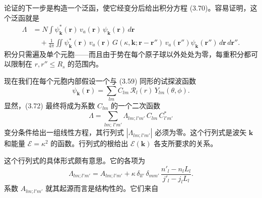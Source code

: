 
论证的下一步是构造一个泛函，使它经变分后给出积分方程 (3.70)。容易证明，这个泛函就是
\begin{align*}
\Lambda&=N\int\psi_{\mathbf{k}}^{*}(\mathbf{r})\,v_a(\mathbf{r})\,\psi_{\mathbf{k}}(\mathbf{r})\,d\mathbf{r}\\
&\quad+\frac{1}{4\pi}\iint\psi_{\mathbf{k}}^{*}(\mathbf{r})\,v_a(\mathbf{r})\,G(\kappa,\mathbf{k};\mathbf{r}-\mathbf{r}'')\,v_a(\mathbf{r}'')\psi_{\mathbf{k}}(\mathbf{r}'')\,d\mathbf{r}\,d\mathbf{r}''.\tag{3.72}
\end{align*}
积分只需遍及单个元胞——而且由于势在每个原子球以外处处为零，每重积分都可以限制在 $r,r''\leqslant R_s$ 的范围内。

现在我们在每个元胞内部假设一个与 (3.59) 同形的试探波函数
\begin{equation*}
\psi_{\mathbf{k}}(\mathbf{r})=\sum_{lm}C_{lm}\,\mathcal{R}_l(r)\,Y_{lm}(\theta,\phi).\tag{3.73}
\end{equation*}
显然，(3.72) 最终将成为系数 $C_{lm}$ 的一个二次函数
\begin{equation*}
\Lambda=\sum_{lm;\,l'm'}\Lambda_{lm;l'm'}\,C_{lm}\,C_{l'm'}^{*}\tag{3.74}
\end{equation*}
变分条件给出一组线性方程，其行列式 $|\Lambda_{lm;l'm'}|$ 必须为零。这个行列式是波矢 $\mathbf{k}$ 和能量 $\mathcal{E}=\kappa^2$ 的函数。行列式的根给出 $\mathcal{E}(\mathbf{k})$ 各支所要求的关系。

这个行列式的具体形式颇有意思。它的各项为
\begin{equation*}
\Lambda_{lm;l'm'}=A_{lm;l'm'}+\kappa\,\delta_{ll'}\,\delta_{mm'}\,\frac{n'_l-n_l L_l}{j'_l-j_l L_l}.\tag{3.75}
\end{equation*}
系数 $A_{lm;l'm'}$ 就其起源而言是结构性的。它们来自
